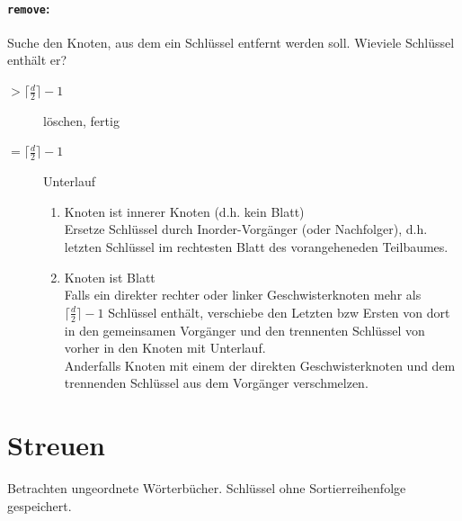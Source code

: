 \documentclass{scrartcl}
\begin{document}
\paragraph{\texttt{remove}:} Suche den Knoten, aus dem ein Schlüssel entfernt werden soll. Wieviele Schlüssel enthält er?
\begin{description}
	\item[$>\lceil\frac{d}{2}\rceil -1$] löschen, fertig
	\item[$=\lceil\frac{d}{2}\rceil -1$] Unterlauf
	\begin{enumerate}
		\item Knoten ist innerer Knoten (d.h. kein Blatt)\\
		Ersetze Schlüssel durch Inorder-Vorgänger (oder Nachfolger), d.h. letzten Schlüssel im rechtesten Blatt des vorangeheneden Teilbaumes.
		\item Knoten ist Blatt \\
		Falls ein direkter rechter oder linker Geschwisterknoten mehr als $\lceil\frac{d}{2}\rceil -1$ Schlüssel enthält, verschiebe den Letzten bzw Ersten von dort in den gemeinsamen Vorgänger und den trennenten Schlüssel von vorher in den Knoten mit Unterlauf. \\
		Anderfalls Knoten mit einem der direkten Geschwisterknoten und dem trennenden Schlüssel aus dem Vorgänger verschmelzen.
	\end{enumerate}
\end{description}


\section{Streuen}
Betrachten ungeordnete Wörterbücher. Schlüssel ohne Sortierreihenfolge gespeichert.
\end{document}
